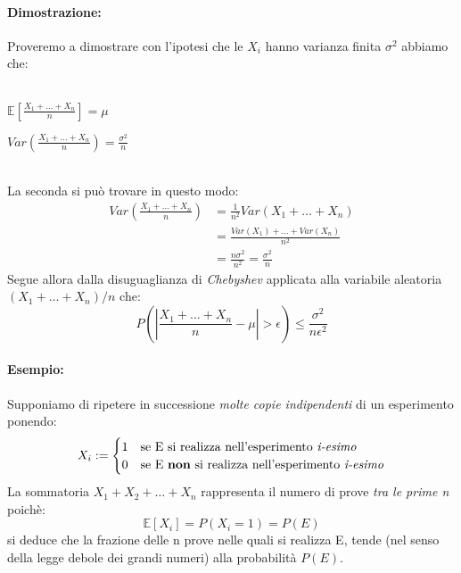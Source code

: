 \documentclass[]{article}
\newcommand{\ev}{\mathbb{E}[X]}
\renewcommand{\ev}[1]{\mathbb{E}[#1]}
\begin{document}
    \paragraph{Dimostrazione:} Proveremo a dimostrare con l'ipotesi che le $X_i$ hanno varianza finita $\sigma^2$ abbiamo che: \\ \\
    \begin{minipage}{0.4\textwidth}
        $ \ev{\frac{X_1 + \ldots + X_n}{n}} = \mu $
    \end{minipage}
    \begin{minipage}{0.4\textwidth}
        $ Var(\frac{X_1 + \ldots + X_n}{n}) = \frac{\sigma^2}{n} $
    \end{minipage} \\
    \linebreak[4]
    La seconda si può trovare in questo modo:
    \begin{equation*}
        \begin{split}
            Var(\frac{X_1 + \ldots + X_n}{n}) & = \frac{1}{n^2} Var(X_1 + \ldots + X_n) \\
            & = \frac{Var(X_1) + \ldots + Var(X_n)}{n^2} \\
            & = \frac{n\sigma^2}{n^2} = \frac{\sigma^2}{n}
        \end{split}
    \end{equation*}
    Segue allora dalla disuguaglianza di \textit{Chebyshev} applicata alla variabile aleatoria $(X_1 + \ldots + X_n)/n$ che:
    \[ P(| \frac{X_1 + \ldots + X_n}{n} - \mu | > \epsilon) \leq \frac{\sigma^2}{n\epsilon^2}\]
    \paragraph{Esempio:} Supponiamo di ripetere in successione \textit{molte copie indipendenti} di un esperimento ponendo:
    \begin{equation*}
        X_i :=
        \begin{cases}
            1 & \text{se E si realizza nell'esperimento \textit{i-esimo}} \\
            0 & \text{se E \textbf{non} si realizza nell'esperimento \textit{i-esimo}}
        \end{cases}
    \end{equation*}
    La sommatoria $X_1 + X_2 + \ldots + X_n$ rappresenta il numero di prove \textit{tra le prime n} poichè:
    \[ \ev{X_i} = P(X_i = 1) = P(E) \]
    si deduce che la frazione delle n prove nelle quali si realizza E, tende (nel senso della
    legge debole dei grandi numeri) alla probabilità $P(E)$.
\end{document}

